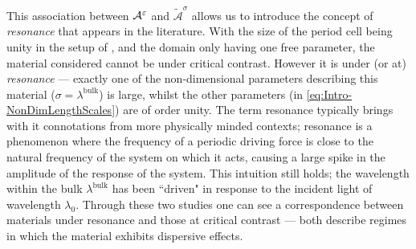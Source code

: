 This association between $\mathcal{A}^{\varepsilon}$ and $\widetilde{\mathcal{A}}^{\sigma}$ allows us to introduce the concept of \emph{resonance} that appears in the literature.
With the size of the period cell being unity in the setup of \cite{hempel2000spectral}, and the domain only having one free parameter, the material considered cannot be under critical contrast.
However it is under (or at) \emph{resonance} --- exactly one of the non-dimensional parameters describing this material ($\sigma=\lambda^{\mathrm{bulk}}$) is large, whilst the other parameters (in \eqref{eq:Intro-NonDimLengthScales}) are of order unity.
The term resonance typically brings with it connotations from more physically minded contexts; resonance is a phenomenon where the frequency of a periodic driving force is close to the natural frequency of the system on which it acts, causing a large spike in the amplitude of the response of the system.
This intuition still holds; the wavelength within the bulk $\lambda^{\mathrm{bulk}}$ has been ``driven" in response to the incident light of wavelength $\lambda_0$.
Through these two studies one can see a correspondence between materials under resonance and those at critical contrast --- both describe regimes in which the material exhibits dispersive effects.

